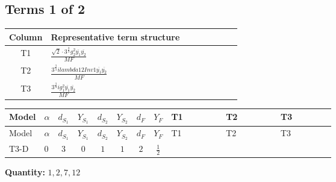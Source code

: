 \documentclass[8pt]{article}
\begin{document}
\begin{landscape}
\subsection*{Terms 1 of 2}
\begin{center}
\begin{tabular}{@{}c >{\raggedright\arraybackslash}p{0.82\linewidth}@{}}
\toprule
Column & Representative term structure \\
\midrule
T1 & \(\displaystyle \frac{\sqrt{2} \cdot 3^{\frac{3}{4}} g_{2}^{2} \overline{y_{1}} \overline{y_{2}}}{MF}\) \\
\midrule
T2 & \(\displaystyle \frac{3^{\frac{3}{4}} i lambda12Inv1 \overline{y_{1}} \overline{y_{2}}}{MF}\) \\
\midrule
T3 & \(\displaystyle \frac{3^{\frac{3}{4}} i g_{1}^{2} \overline{y_{1}} \overline{y_{2}}}{MF}\) \\
\midrule
\bottomrule
\end{tabular}
\end{center}
\smallskip
\tiny
\begin{longtable}{@{}llcccccc >{\raggedright\arraybackslash}p{0.21\linewidth} >{\raggedright\arraybackslash}p{0.21\linewidth} >{\raggedright\arraybackslash}p{0.21\linewidth}@{}}
\toprule
Model & $\alpha$ & $d_{S_1}$ & $Y_{S_1}$ & $d_{S_2}$ & $Y_{S_2}$ & $d_F$ & $Y_F$ & T1 & T2 & T3 \\
\midrule
\endfirsthead
\toprule
Model & $\alpha$ & $d_{S_1}$ & $Y_{S_1}$ & $d_{S_2}$ & $Y_{S_2}$ & $d_F$ & $Y_F$ & T1 & T2 & T3 \\
\midrule
\endhead
T3-D & $0$ & $3$ & $0$ & $1$ & $1$ & $2$ & $\frac{1}{2}$ & \scriptsize\adjustbox{max width=\linewidth}{$\begin{gathered} - \frac{\sqrt{2} \cdot 3^{\frac{3}{4}} g_{2}^{2} \overline{y_{1}} \overline{y_{2}}}{6 MF}\end{gathered}$} & \scriptsize\adjustbox{max width=\linewidth}{$\begin{gathered} \frac{3^{\frac{3}{4}} i lambda12Inv1 \overline{y_{1}} \overline{y_{2}}}{6 MF}\end{gathered}$} & \scriptsize\adjustbox{max width=\linewidth}{$\begin{gathered} \frac{3^{\frac{3}{4}} i g_{1}^{2} \overline{y_{1}} \overline{y_{2}}}{8 MF}\end{gathered}$} \\
\midrule
\bottomrule
\end{longtable}
\clearpage
\noindent\textbf{Quantity: }$\mathrm{1,2,7,12}$\par\smallskip

\end{landscape}
\end{document}

